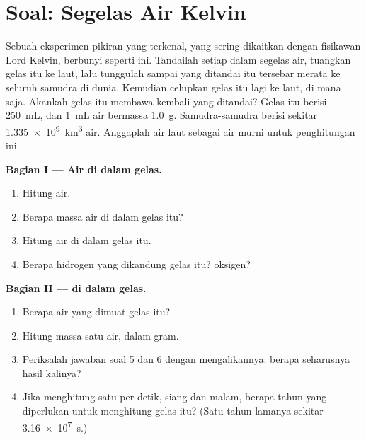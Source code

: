 \section{Soal: Segelas Air Kelvin}

\begin{problem}
\label{pb:g10:the-mole:1}
Sebuah eksperimen pikiran yang terkenal, yang sering dikaitkan dengan
fisikawan Lord Kelvin, berbunyi seperti ini. Tandailah setiap 
dalam segelas air, tuangkan gelas itu ke laut, lalu tunggulah sampai
 yang ditandai itu tersebar merata ke seluruh samudra di
dunia. Kemudian celupkan gelas itu lagi ke laut, di mana saja. Akankah
gelas itu membawa kembali  yang ditandai? Gelas itu berisi
\qty{250}{mL}, dan \qty{1}{mL} air bermassa \qty{1.0}{g}. Samudra-samudra
berisi sekitar \qty{1.335e9}{km^3} air. Anggaplah air laut sebagai air
murni untuk penghitungan ini.

\medskip
\noindent\textbf{Bagian I --- Air di dalam gelas.}
\begin{enumerate}
  \item Hitung  air.
  \item Berapa massa air di dalam gelas itu?
  \item Hitung   air di dalam gelas itu.
  \item Berapa   hidrogen yang dikandung gelas itu? 
        oksigen?
\end{enumerate}

\medskip
\noindent\textbf{Bagian II ---  di dalam gelas.}
\begin{enumerate}[resume]
  \item Berapa  air yang dimuat gelas itu?
  \item Hitung massa satu  air, dalam gram.
  \item Periksalah jawaban soal 5 dan 6 dengan mengalikannya: berapa
        seharusnya hasil kalinya?
  \item Jika menghitung satu  per detik, siang dan malam, berapa
        tahun yang diperlukan untuk menghitung  gelas itu?
        (Satu tahun lamanya sekitar \qty{3.16e7}{s}.)
\end{enumerate}


\end{problem}

